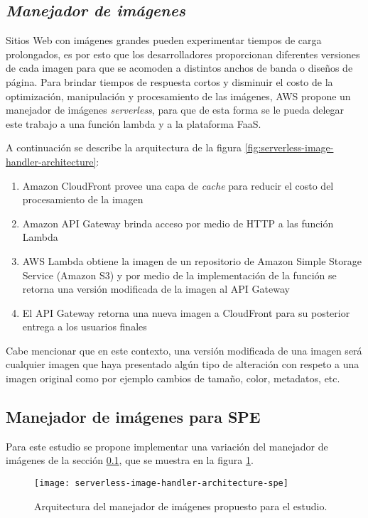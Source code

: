 \subsection{\emph{Manejador de imágenes}} \label{sec:manejador-imagenes-1}
Sitios Web con imágenes grandes pueden experimentar tiempos de carga prolongados, es por esto que los desarrolladores proporcionan diferentes versiones de cada imagen para que se acomoden a distintos anchos de banda o diseños de página. Para brindar tiempos de respuesta cortos y disminuir el costo de la optimización, manipulación y procesamiento de las imágenes, AWS propone un manejador de imágenes \emph{serverless}, para que de esta forma se le pueda delegar este trabajo a una función lambda y a la plataforma FaaS.


A continuación se describe la arquitectura de la figura \ref{fig:serverless-image-handler-architecture}:
\begin{enumerate}
    \item Amazon CloudFront provee una capa de \emph{cache} para reducir el costo del procesamiento de la imagen
    \item Amazon API Gateway brinda acceso por medio de HTTP a las función Lambda
    \item AWS Lambda obtiene la imagen de un repositorio de Amazon Simple Storage Service (Amazon S3) y por medio de la implementación de la función se retorna una versión modificada de la imagen al API Gateway
    \item El API Gateway retorna una nueva imagen a CloudFront para su posterior entrega a los usuarios finales
\end{enumerate}

Cabe mencionar que en este contexto, una versión modificada de una imagen será cualquier imagen que haya presentado algún tipo de alteración con respeto a una imagen original como por ejemplo cambios de tamaño, color, metadatos, etc.

\subsection{Manejador de imágenes para SPE} \label{sec:manejador-imagenes-spe}
Para este estudio se propone implementar una variación del manejador de imágenes de la sección \ref{sec:manejador-imagenes-1}, que se muestra en la figura \ref{fig:serverless-image-handler-architecture-spe}.

\begin{figure}[h]
  \centering
  \texttt{[image: serverless-image-handler-architecture-spe]}
  \caption[Arquitectura del manejador de imágenes propuesto para el estudio]{Arquitectura del manejador de imágenes propuesto para el estudio.}
  \label{fig:serverless-image-handler-architecture-spe}
\end{figure}

